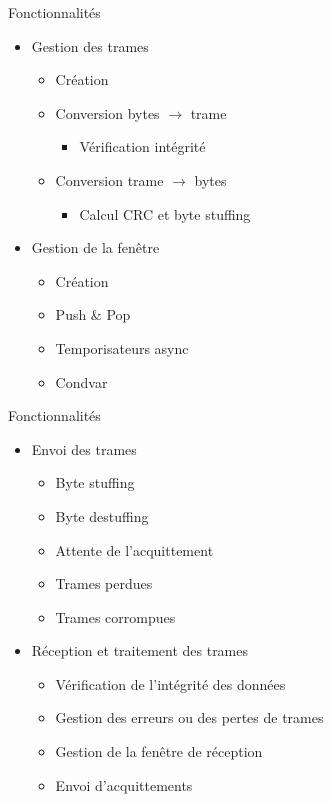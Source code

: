 \documentclass{beamer}
\begin{document}
\begin{frame}{Fonctionnalités}
	\begin{itemize}
		\item Gestion des trames
		      \begin{itemize}
			      \item Création
			      \item Conversion bytes $\rightarrow$ trame
			            \begin{itemize}
				            \item Vérification intégrité
			            \end{itemize}
			      \item Conversion trame $\rightarrow$ bytes
			            \begin{itemize}
				            \item Calcul CRC et byte stuffing
			            \end{itemize}
		      \end{itemize}
		\item Gestion de la fenêtre
		      \begin{itemize}
			      \item Création
			      \item Push \& Pop
			      \item Temporisateurs async
			      \item Condvar
		      \end{itemize}
	\end{itemize}
\end{frame}

\begin{frame}{Fonctionnalités}
	\begin{itemize}
		\item Envoi des trames
		      \begin{itemize}
			      \item Byte stuffing
			      \item Byte destuffing
			      \item Attente de l'acquittement
			      \item Trames perdues
			      \item Trames corrompues
		      \end{itemize}
		\item Réception et traitement des trames
		      \begin{itemize}
			      \item Vérification de l'intégrité des données
			      \item Gestion des erreurs ou des pertes de trames
			      \item Gestion de la fenêtre de réception
			      \item Envoi d'acquittements
		      \end{itemize}
	\end{itemize}
\end{frame}
\end{document}
